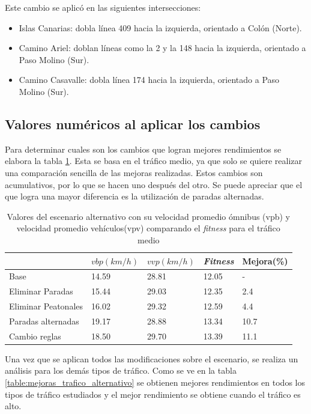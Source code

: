 Este cambio se aplicó en las siguientes intersecciones:
\begin{itemize}
	\item Islas Canarias: dobla línea 409 hacia la izquierda, orientado a Colón (Norte).
	\item Camino Ariel: doblan líneas como la  2 y la 148 hacia la izquierda, orientado a Paso Molino (Sur). 
	\item Camino Casavalle: dobla línea 174 hacia la izquierda, orientado a Paso Molino (Sur). 
\end{itemize}

\subsection{Valores numéricos al aplicar los cambios}

Para determinar cuales son los cambios que logran mejores rendimientos se elabora la tabla \ref{table:resultado_alternativo}. Esta se basa en el tráfico medio, ya que solo se quiere realizar una comparación sencilla de las mejoras realizadas. Estos cambios son acumulativos, por lo que se hacen uno después del otro. Se puede apreciar que el que logra una mayor diferencia es la utilización de paradas alternadas.


\begin{table}[H]
	\renewcommand{\arraystretch}{1.2}
	\caption{Valores del escenario alternativo con su velocidad promedio ómnibus (vpb) y velocidad promedio vehículos(vpv) comparando el \emph{fitness} para el tráfico medio }
	\label{table:resultado_alternativo}
	\centering
	\begin{tabular}{p{3.5cm}p{2.5cm}p{2.5cm}p{2cm}p{2cm} }
		\hline
		&
		$vbp(km/h)$& 
		$vvp(km/h)$ & 
		\emph{Fitness} &
		Mejora(\%)
		\\ 
		\hline
		Base & 14.59  & 28.81& 12.05 & -\\
		Eliminar Paradas & 15.44  & 29.03& 12.35 & 2.4\\
		Eliminar Peatonales  & 16.02  & 29.32& 12.59 & 4.4\\
		Paradas alternadas  & 19.17  & 28.88& 13.34 & 10.7\\	
		Cambio reglas  & 18.50  & 29.70& 13.39 & 11.1\\				
		\hline
	\end{tabular}
\end{table}

Una vez que se aplican todos las modificaciones sobre el escenario, se realiza un análisis para los demás tipos de tráfico. Como se ve en la tabla \ref{table:mejoras_trafico_alternativo} se obtienen mejores rendimientos en todos los tipos de tráfico estudiados y el mejor rendimiento se obtiene cuando el tráfico es alto. 

